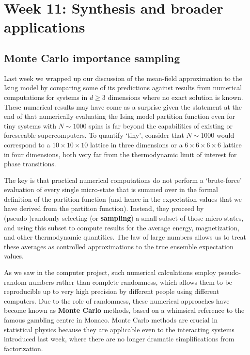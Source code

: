 \renewcommand{\thisweek}{MATH327 Week 11}
\renewcommand{\moddate}{Last modified 7 May 2021}
\setcounter{section}{11}
\setcounter{subsection}{0}
{}
\section*{Week 11: Synthesis and broader applications}
\subsection{\label{sec:MonteCarlo}Monte Carlo importance sampling}
Last week we wrapped up our discussion of the mean-field approximation to the Ising model by comparing some of its predictions against results from numerical computations for systems in $d \geq 3$ dimensions where no exact solution is known.
These numerical results may have come as a surprise given the statement at the end of  that numerically evaluating the Ising model partition function even for tiny systems with $N \sim 1000$ spins is far beyond the capabilities of existing or foreseeable supercomputers.
To quantify `tiny', consider that $N \sim 1000$ would correspond to a $10\times 10\times 10$ lattice in three dimensions or a $6\times 6\times 6\times 6$ lattice in four dimensions, both very far from the thermodynamic limit of interest for phase transitions.

The key is that practical numerical computations do not perform a `brute-force' evaluation of every single micro-state that is summed over in the formal definition of the partition function (and hence in the expectation values that we have derived from the partition function).
Instead, they proceed by (pseudo-)randomly selecting (or \textbf{sampling}) a small subset of those micro-states, and using this subset to compute results for the average energy, magnetization, and other thermodynamic quantities.
The law of large numbers allows us to treat these averages as controlled approximations to the true ensemble expectation values.

As we saw in the computer project, such numerical calculations employ pseudo-random numbers rather than complete randomness, which allows them to be reproducible up to very high precision by different people using different computers.
Due to the role of randomness, these numerical approaches have become known as \textbf{Monte Carlo} methods, based on a whimsical reference to the famous gambling centre in Monaco.
Monte Carlo methods are crucial in statistical physics because they are applicable even to the interacting systems introduced last week, where there are no longer dramatic simplifications from factorization.

